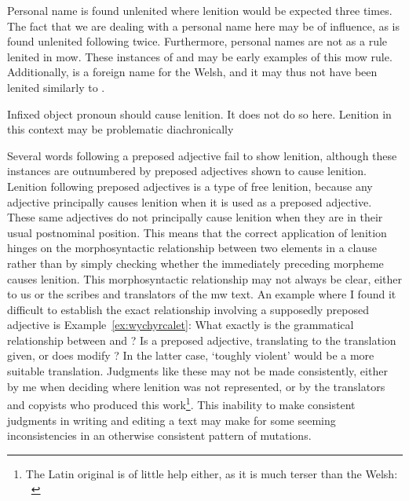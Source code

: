 Personal name  is found unlenited where lenition would be expected three times.
The fact that we are dealing with a personal name here may be of influence, as  is found unlenited following  twice.
Furthermore, personal names are not as a rule lenited in \gls{mow}.
These instances of  and  may be early examples of this \gls{mow} rule.
Additionally,  is a foreign name for the Welsh, and it may thus not have been lenited similarly to .

Infixed object pronoun  should cause lenition. It does not do so here.
Lenition in this context may be problematic diachronically 

Several words following a preposed adjective fail to show lenition, although these instances are outnumbered by preposed adjectives shown to cause lenition.
Lenition following preposed adjectives is a type of free lenition, because any adjective principally causes lenition when it is used as a preposed adjective.
These same adjectives do not principally cause lenition when they are in their usual postnominal position.
This means that the correct application of lenition hinges on the morphosyntactic relationship between two elements in a clause rather than by simply checking whether the immediately preceding morpheme causes lenition.
This morphosyntactic relationship may not always be clear, either to us or the scribes and translators of the \gls{mw} text.
An example where I found it difficult to establish the exact relationship involving a supposedly preposed adjective is Example~\ref{ex:wychyrcalet}:
What exactly is the grammatical relationship between  and ?
Is  a preposed adjective, translating to the translation given, or does  modify ?
In the latter case, `toughly violent' would be a more suitable translation. 
Judgments like these may not be made consistently, either by me when deciding where lenition was not represented, or by the translators and copyists who produced this work\footnote{The Latin original is of little help either, as it is much terser than the Welsh: ~\autocite[269]{griscom_historia_1929}}.
This inability to make consistent judgments in writing and editing a text may make for some seeming inconsistencies in an otherwise consistent pattern of mutations.

